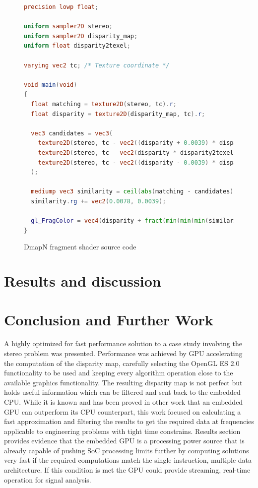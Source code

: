 \documentclass[conference]{IEEEtran}
\begin{document}
\begin{figure}[!t]
 \begin{lstlisting}[language=GLSL, frame=single, basicstyle=\scriptsize]
precision lowp float;

uniform sampler2D stereo;
uniform sampler2D disparity_map;
uniform float disparity2texel;

varying vec2 tc; /* Texture coordinate */

void main(void)
{
  float matching = texture2D(stereo, tc).r;
  float disparity = texture2D(disparity_map, tc).r;

  vec3 candidates = vec3(
    texture2D(stereo, tc - vec2((disparity + 0.0039) * disparity2texel, 0.0)).g,
    texture2D(stereo, tc - vec2(disparity * disparity2texel, 0.0)).g,
    texture2D(stereo, tc - vec2((disparity - 0.0039) * disparity2texel, 0.0)).g
  );

  mediump vec3 similarity = ceil(abs(matching - candidates) * 255.0);
  similarity.rg += vec2(0.0078, 0.0039);

  gl_FragColor = vec4(disparity + fract(min(min(min(similarity.r, similarity.g), similarity.b), 120.0039)) - 0.0039, 0.0, 0.0, 1.0);
}
 \end{lstlisting}
 \caption{DmapN fragment shader source code}
 \label{fig:fs_dmapN}
\end{figure}


\section{Results and discussion}




\section{Conclusion and Further Work}

A highly optimized for fast performance solution to a case study involving the stereo problem was presented. Performance was achieved by GPU accelerating the computation of the disparity map, carefully selecting the OpenGL ES 2.0 functionality to be used and keeping every algorithm operation close to the available graphics functionality. The resulting disparity map is not perfect but holds useful information which can be filtered and sent back to the embedded CPU. While it is known and has been proved in other work that an embedded GPU can outperform its CPU counterpart, this work focused on calculating a fast approximation and filtering the results to get the required data at frequencies applicable to engineering problems with tight time constrains. Results section provides evidence that the embedded GPU is a processing power source that is already capable of pushing SoC processing limits further by computing solutions very fast if the required computations match the single instruction, multiple data architecture. If this condition is met the GPU could provide streaming, real-time operation for signal analysis.
\end{document}
